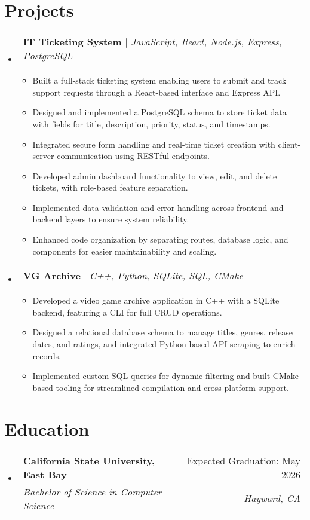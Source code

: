 \documentclass[letterpaper,11pt]{article}
\makeatletter
\newcommand{\resumeItem}[1]{
  \item\small{
    {#1 \vspace{-2pt}}
  }
}
\newcommand{\resumeEducationHeading}[4]{
  \vspace{-2pt}\item
    \begin{tabular*}{0.97\textwidth}[t]{l@{\extracolsep{\fill}}r}
      \textbf{\normalsize #1} & \normalsize #2 \\
      \textit{\small #3} & \textit{\small #4} \\
    \end{tabular*}\vspace{-7pt}
}
\newcommand{\resumeProjectHeading}[2]{
    \item
    \begin{tabular*}{0.97\textwidth}{l@{\extracolsep{\fill}}r}
      \small#1 & #2 \\
    \end{tabular*}\vspace{-7pt}
}
\newcommand{\resumeSubHeadingListStart}{\begin{itemize}[leftmargin=0.15in, label={}]}
\newcommand{\resumeSubHeadingListEnd}{\end{itemize}}
\newcommand{\resumeItemListStart}{\begin{itemize}}
\newcommand{\resumeItemListEnd}{\end{itemize}\vspace{-5pt}}
\makeatother
\begin{document}
\section{Projects}
    \resumeSubHeadingListStart
      \resumeProjectHeading
          {\textbf{IT Ticketing System} $|$ \emph{JavaScript, React, Node.js, Express, PostgreSQL}}{}
          \resumeItemListStart
            \resumeItem{Built a full-stack ticketing system enabling users to submit and track support requests through a React-based interface and Express API.}
            \resumeItem{Designed and implemented a PostgreSQL schema to store ticket data with fields for title, description, priority, status, and timestamps.}
            \resumeItem{Integrated secure form handling and real-time ticket creation with client-server communication using RESTful endpoints.}
            \resumeItem{Developed admin dashboard functionality to view, edit, and delete tickets, with role-based feature separation.}
            \resumeItem{Implemented data validation and error handling across frontend and backend layers to ensure system reliability.}
             \resumeItem{Enhanced code organization by separating routes, database logic, and components for easier maintainability and scaling.}
             \resumeItemListEnd
        \resumeProjectHeading
            {\textbf{VG Archive} $|$ \emph{C++, Python, SQLite, SQL, CMake}}{}
          \resumeItemListStart
            \resumeItem{Developed a video game archive application in C++ with a SQLite backend, featuring a CLI for full CRUD operations.}
            \resumeItem{Designed a relational database schema to manage titles, genres, release dates, and ratings, and integrated Python-based API scraping to enrich records.}
            \resumeItem{Implemented custom SQL queries for dynamic filtering and built CMake-based tooling for streamlined compilation and cross-platform support.}
          \resumeItemListEnd
    \resumeSubHeadingListEnd

\section{Education}
  \resumeSubHeadingListStart
    \resumeEducationHeading
      {California State University, East Bay}{Expected Graduation: May 2026}
      {Bachelor of Science in Computer Science}{Hayward, CA}
\resumeSubHeadingListEnd 
\end{document}
